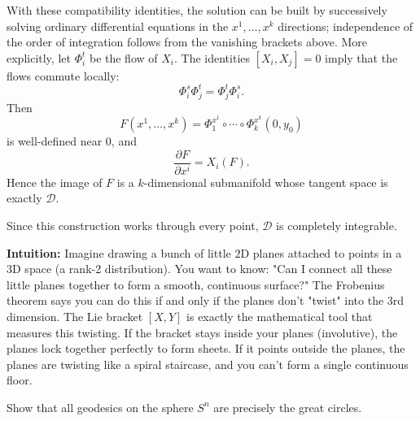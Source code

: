 \begin{solution}
With these compatibility identities, the solution can be built by successively solving ordinary differential equations in the $x^1,\dots,x^k$ directions; independence of the order of integration follows from the vanishing brackets above. More explicitly, let $\Phi_i^t$ be the flow of $X_i$. The identities $[X_i,X_j]=0$ imply that the flows commute locally:
\[
\Phi_i^s\Phi_j^t=\Phi_j^t\Phi_i^s.
\]
Then
\[
F(x^1,\dots,x^k)
=
\Phi_1^{x^1}\circ\cdots\circ\Phi_k^{x^k}(0,y_0)
\]
is well-defined near $0$, and
\[
\frac{\partial F}{\partial x^i}=X_i(F).
\]
Hence the image of $F$ is a $k$-dimensional submanifold whose tangent space is exactly $\mathcal D$.

Since this construction works through every point, $\mathcal D$ is completely integrable.

\textbf{Intuition:}
Imagine drawing a bunch of little $2 \text{D}$ planes attached to points in a $3 \text{D}$ space (a rank-2 distribution). You want to know: "Can I connect all these little planes together to form a smooth, continuous surface?" The Frobenius theorem says you can do this if and only if the planes don't "twist" into the 3rd dimension. The Lie bracket $[X, Y]$ is exactly the mathematical tool that measures this twisting. If the bracket stays inside your planes (involutive), the planes lock together perfectly to form sheets. If it points outside the planes, the planes are twisting like a spiral staircase, and you can't form a single continuous floor.
\end{solution}

\begin{exercise}
\label{geometry:2016:10}
Show that all geodesics on the sphere $S^{n}$ are precisely the great circles.
\end{exercise}

